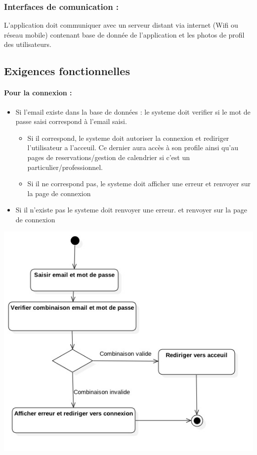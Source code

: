 \documentclass{article}
\begin{document}
\subsubsection{Interfaces de comunication :}
L'application doit communiquer avec un serveur distant via internet
(Wifi ou réseau mobile) contenant base de donnée de l'application et
les photos de profil des utilisateurs.


\subsection{Exigences fonctionnelles}
\paragraph{Pour la connexion : }

\begin{itemize}
\item Si l'email existe dans la base de données :
	le systeme doit verifier si le mot de passe saisi
	correspond à l'email saisi.
		\begin{itemize}
		\item Si il correspond, le systeme doit autoriser la connexion et
			rediriger l'utilisateur a l'acceuil. Ce dernier aura accès à son
			profile ainsi qu'au pages de reservations/gestion de calendrier
			si c'est un particulier/professionnel.
		\item Si il ne correspond pas, le systeme doit afficher une erreur
			et renvoyer sur la page de connexion
		\end{itemize}
\item Si il n'existe pas le systeme doit renvoyer une erreur.
	et renvoyer sur la page de connexion
\end{itemize}

\includegraphics[scale=0.6]{ShematDiagrammes/activiteConnexion.jpg}
\end{document}
